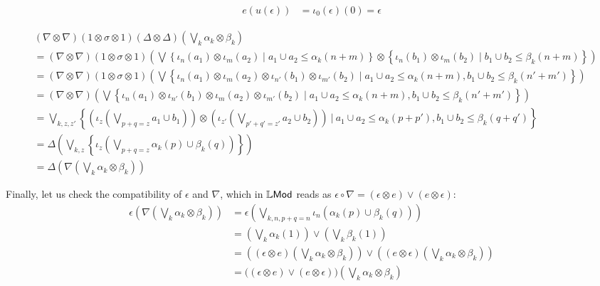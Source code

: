 \begin{itemize}
\begin{align*}
e(u(\epsilon))&= \iota_{0}(\epsilon)(0)= \epsilon
\end{align*}




{\small
\begin{align*}
&(\nabla\otimes \nabla)  (1\otimes \sigma\otimes 1)(\Delta\otimes \Delta)\left (\bigvee_{k}\alpha_{k}\otimes \beta_{k}\right) \\
&=
(\nabla\otimes \nabla)(1\otimes \sigma\otimes 1)
\left(
\bigvee
\left\{
 \iota_{n}(a_{1})\otimes \iota_{m}(a_{2})\mid
a_{1}\cup a_{2}\leq \alpha_{k}(n+m)
\right\}\otimes
\left\{
 \iota_{n}(b_{1})\otimes \iota_{m}(b_{2})\mid
b_{1}\cup b_{2}\leq \beta_{k}(n+m)
\right\}
\right)\\
&=
(\nabla\otimes \nabla)(1\otimes \sigma\otimes 1)
\left(
\bigvee
\left\{
 \iota_{n}(a_{1})\otimes \iota_{m}(a_{2})
\otimes \iota_{n'}(b_{1})\otimes \iota_{m'}(b_{2})
\mid
a_{1}\cup a_{2}\leq \alpha_{k}(n+m),
b_{1}\cup b_{2}\leq \beta_{k}(n'+m')
\right\}
\right)\\
&=
(\nabla\otimes \nabla)\left(
\bigvee
\left\{
 \iota_{n}(a_{1})\otimes \iota_{n'}(b_{1})
\otimes \iota_{m}(a_{2})\otimes \iota_{m'}(b_{2})
\mid
a_{1}\cup a_{2}\leq \alpha_{k}(n+m),
b_{1}\cup b_{2}\leq \beta_{k}(n'+m')
\right\}
\right)\\
&=
\bigvee_{k,z,z'}\left\{
\left(
\iota_{z}\left( \bigvee_{p+q=z}
a_{1}\cup b_{1}\right)\right)\otimes
\left(\iota_{z'}\left( \bigvee_{p'+q'=z'}
a_{2}\cup b_{2}\right)\right)
\ \Bigg \vert \
a_{1}\cup a_{2} \leq \alpha_{k}(p+p'),
b_{1}\cup b_{2}\leq \beta_{k}(q+q')
\right\}
\\
&=\Delta\left(
\bigvee_{k,z}
\left\{
\iota_{z}\left( \bigvee_{p+q=z} \alpha_{k}(p)\cup \beta_{k}(q) \right)
\right\}
\right)
\\
&=
\Delta\left (\nabla\left(\bigvee_{k}\alpha_{k}\otimes \beta_{k}\right) \right)
\end{align*}
}

Finally, let us check the compatibility of $\epsilon$ and $\nabla$, which in $\mathbb{L}\mathsf{Mod}$ reads as
$ \epsilon\circ \nabla=(\epsilon \otimes e)\vee (e\otimes \epsilon)$:
{\small\begin{align*}
\epsilon \left(\nabla\left(\bigvee_{k}\alpha_{k}\otimes \beta_{k}\right)\right) & =
\epsilon\left (  \bigvee_{k,n,p+q=n}\iota_{n}(\alpha_{k}(p)\cup \beta_{k}(q))\right) \\
&=\left(\bigvee_{k}\alpha_{k}(1) \right) \vee \left(
\bigvee_{k}\beta_{k}(1)\right)
\\
&=
\left( (\epsilon\otimes e)\left(\bigvee_{k}\alpha_{k}\otimes \beta_{k}\right)
\right)
\vee
\left( (e\otimes \epsilon)\left(\bigvee_{k}\alpha_{k}\otimes \beta_{k}\right)
\right)
\\
&=
\Big((\epsilon\otimes e)\vee (e\otimes \epsilon)\Big)\left(\bigvee_{k}\alpha_{k}\otimes \beta_{k}\right)
 \end{align*}
}



\end{itemize}
